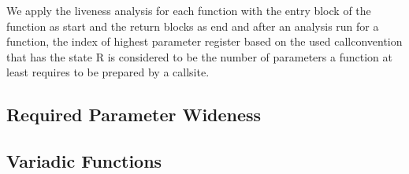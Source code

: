 
\begin{table}

\caption{Different mappings for combining two liveness state values in horizontal matching for the COUNT policy}

\label{fig:COUNTlivenessmapping}
\end{table}

We apply the liveness analysis for each function with the entry block of the function as start and the return blocks as end and after an analysis run for a function, the index of highest parameter register based on the used callconvention that has the state R is considered to be the number of parameters a function at least requires to be prepared by a callsite.


\subsection{Required Parameter Wideness}
\label{subsection:requiredparamwideness}

\subsection{Variadic Functions}
\label{subsection:variadicfunctions}


